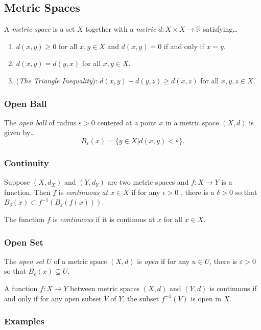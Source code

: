 \subsection{Metric Spaces}\label{metricspace}

A \emph{metric space} is a set $X$ together with a \emph{metric}\label{metric} $d : X \times X \rightarrow \mathbb{R}$ satisfying\dots
\begin{enumerate}
  \item $d(x,y) \geq 0$ for all $x,y \in X$ and $d(x,y) = 0$ if and only if $x = y$.
  \item $d(x,y) = d(y,x)$ for all $x,y \in X$.
  \item (\emph{The Triangle Inequality}\label{triangleinequality}): $d(x,y) + d(y,z) \geq d(x,z)$ for all $x,y,z \in X.$
\end{enumerate}

\subsubsection{Open Ball}\label{metricopenball}
The \emph{open ball} of radius $\varepsilon > 0$ centered at a point $x$ in a metric space $(X,d)$ is given by\dots
$$B_{\varepsilon}(x) = \{ y \in X | d(x,y) < \varepsilon\}.$$

\subsubsection{Continuity}\label{metriccontinuity}
Suppose $(X,d_X)$ and $(Y,d_Y)$ are two metric spaces and $f: X \rightarrow Y$ is a function. Then $f$ is \emph{continuous at} $x\in X$ if for any $\epsilon > 0$ , there is a $\delta > 0$
so that $B_{\delta}(x) \subset f^{-1}(B_{\varepsilon}(f(x)))$.\newline

\noindent The function $f$ is \emph{continuous} if it is continous at $x$ for all $x \in X$.

\subsubsection{Open Set}\label{metricopenset}
The \emph{open set} $U$ of a metric space $(X,d)$ is \emph{open} if for any $u \in U$, there is $\varepsilon > 0$ so that $B_{\varepsilon}(x) \subseteq U$.

\begin{theorem}
A function $f:X \rightarrow Y$ between metric spaces $(X,d)$ and $(Y,d)$ is continuous if and only if for any open subset $V$ of $Y$, the subset $f^{-1}(V)$ is open in $X$.
\end{theorem}

\subsubsection{Examples}\label{metricexamples}
